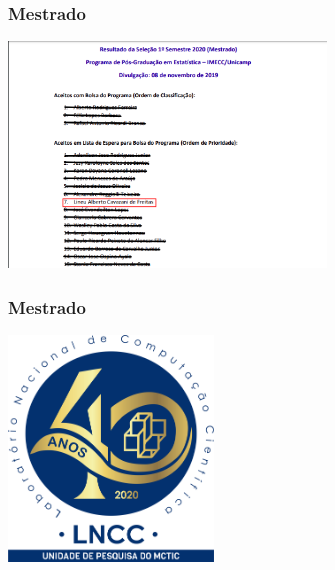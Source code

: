 \documentclass[10pt,
  aspectratio=169,
  serif,
  mathserif,
  professionalfont,
  compress,
  handout,
  ]{beamer}\usepackage[]{graphicx}\usepackage[]{color}
\begin{document}

\begin{frame}

\frametitle{Mestrado}

\begin{center}
  \includegraphics[height=6cm]{img/unicamp_aprova.png}
\end{center}

\end{frame}


\begin{frame}

\frametitle{Mestrado}

\begin{center}
  \includegraphics[height=6cm]{img/lncc.png}
\end{center}

\end{frame}

\end{document}

